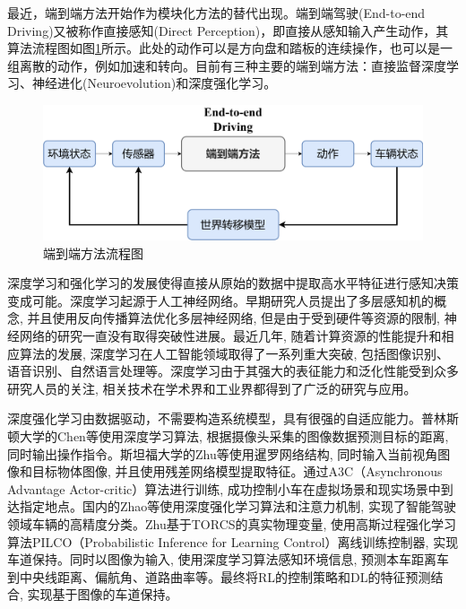 最近，端到端方法开始作为模块化方法的替代出现。端到端驾驶(End-to-end Driving)又被称作直接感知(Direct Perception)\cite{2015DeepDriving}，即直接从感知输入产生动作，其算法流程图如图\ref{端到端方法流程图}所示。此处的动作可以是方向盘和踏板的连续操作，也可以是一组离散的动作，例如加速和转向。目前有三种主要的端到端方法：直接监督深度学习\cite{1989Alvinn}\cite{2016End}、神经进化\cite{1996Evolution}(Neuroevolution)和深度强化学习\cite{2017DRL_end_to_end}。

\begin{figure}[htbp]
  \vspace{13pt} %
  \centering
  \includegraphics[width=1.0\textwidth]{images/chapter1/EndtoEnd_structure.png}
  \caption{端到端方法流程图}\label{端到端方法流程图} %
\end{figure}

深度学习和强化学习的发展使得直接从原始的数据中提取高水平特征进行感知决策变成可能。深度学习起源于人工神经网络。早期研究人员提出了多层感知机的概念, 并且使用反向传播算法优化多层神经网络, 但是由于受到硬件等资源的限制, 神经网络的研究一直没有取得突破性进展。最近几年, 随着计算资源的性能提升和相应算法的发展, 深度学习在人工智能领域取得了一系列重大突破, 包括图像识别、语音识别、自然语言处理等。深度学习由于其强大的表征能力和泛化性能受到众多研究人员的关注, 相关技术在学术界和工业界都得到了广泛的研究与应用。

深度强化学习由数据驱动，不需要构造系统模型，具有很强的自适应能力。普林斯顿大学的Chen等使用深度学习算法, 根据摄像头采集的图像数据预测目标的距离, 同时输出操作指令\cite{2015DeepDriving}。斯坦福大学的Zhu等使用暹罗网络结构, 同时输入当前视角图像和目标物体图像, 并且使用残差网络模型提取特征。通过A3C（Asynchronous Advantage Actor-critic）算法进行训练, 成功控制小车在虚拟场景和现实场景中到达指定地点\cite{2016Target}。国内的Zhao等使用深度强化学习算法和注意力机制, 实现了智能驾驶领域车辆的高精度分类\cite{2017Deepzhao}。Zhu基于TORCS的真实物理变量, 使用高斯过程强化学习算法PILCO（Probabilistic Inference for Learning Control）离线训练控制器, 实现车道保持。同时以图像为输入, 使用深度学习算法感知环境信息, 预测本车距离车到中央线距离、偏航角、道路曲率等。最终将RL的控制策略和DL的特征预测结合, 实现基于图像的车道保持。

